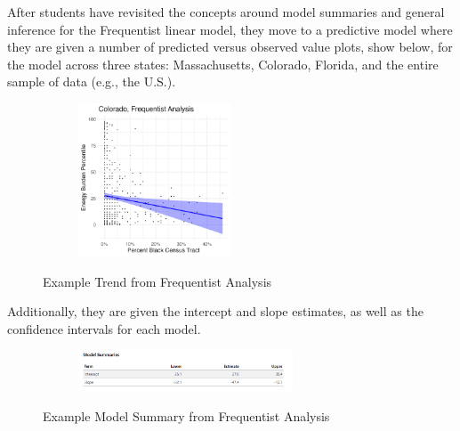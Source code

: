 \documentclass[
  12pt,
  letterpaper,
  DIV=11,
  numbers=noendperiod]{scrartcl}
\begin{document}
After students have revisited the concepts around model summaries and
general inference for the Frequentist linear model, they move to a
predictive model where they are given a number of predicted versus
observed value plots, show below, for the model across three states:
Massachusetts, Colorado, Florida, and the entire sample of data (e.g.,
the U.S.).

\begin{figure}

{\centering 

\begin{figure}[H]

{\centering \includegraphics[width=0.5\textwidth,height=\textheight]{01-mpsa-freq-ex1.png}

}

\end{figure}

}

\caption{\label{fig-freq1}Example Trend from Frequentist Analysis}

\end{figure}

Additionally, they are given the intercept and slope estimates, as well
as the confidence intervals for each model.

\begin{figure}

{\centering 

\begin{figure}[H]

{\centering \includegraphics[width=0.7\textwidth,height=\textheight]{01-mpsa-COfreq-ex1.png}

}

\end{figure}

}

\caption{\label{fig-freq2}Example Model Summary from Frequentist
Analysis}

\end{figure}
\end{document}
